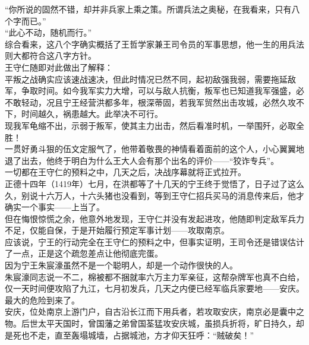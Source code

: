 \begin{multicols}{\theparacolNo}
“你所说的固然不错，却并非兵家上乘之策。所谓兵法之奥秘，在我看来，只有八个字而已。”\\

“此心不动，随机而行。”\\

综合看来，这八个字确实概括了王哲学家兼王司令员的军事思想，他一生的用兵法则大都符合这八字方针。\\

王守仁随即对此做出了解释：\\

平叛之战确实应该速战速决，但此时情况已然不同，起初敌强我弱，需要拖延敌军，争取时间。如今我军实力大增，可以与敌人抗衡，叛军也已知道我军强盛，必不敢轻动，况且宁王经营洪都多年，根深蒂固，若我军贸然出击攻城，必然久攻不下，时间越久，祸患越大。此举决不可行。\\

现我军龟缩不出，示弱于叛军，使其主力出击，然后看准时机，一举围歼，必取全胜！\\

一贯好勇斗狠的伍文定服气了，他带着敬畏的神情看着面前的这个人，小心翼翼地退了出去，他终于明白为什么王大人会有那个出名的评价——“狡诈专兵”。\\

一切都在王守仁的预料之中，几天之后，决战序幕就将正式拉开。\\

正德十四年（1419年）七月，在洪都等了十几天的宁王终于觉悟了，日子过了这么久，别说十六万人，十六头猪也没看到，等到王守仁招兵买马的消息传来后，他才确实一个事实——上当了。\\

但在悔恨惊慌之余，他意外地发现，王守仁并没有发起进攻，他随即判定敌军兵力不足，仅能自保，于是开始履行预定军事计划——攻取南京。\\

应该说，宁王的行动完全在王守仁的预料之中，但事实证明，王司令还是错误估计了一点，正是这个疏忽差点让他彻底完蛋。\\

因为宁王朱宸濠虽然不是一个聪明人，却是一个动作很快的人。\\

朱宸濠同志说一不二，棉被都不捆就率六万主力军亲征，这帮杂牌军也真不白给，仅一天时间便攻陷了九江，七月初发兵，几天之内便已经军临兵家要地——安庆。\\

最大的危险到来了。\\

安庆，位处南京上游门户，自古沿长江而下用兵者，若攻取安庆，南京必是囊中之物。后世太平天国时，曾国藩之弟曾国荃猛攻安庆城，虽损兵折将，旷日持久，却是死也不走，直至轰塌城墙，占据城池，方才仰天狂呼：“贼破矣！”\\


\end{multicols}
